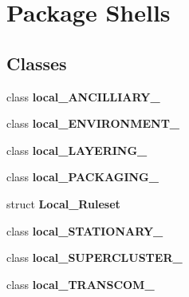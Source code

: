 \hypertarget{namespace_shells}{\section{Package Shells}
\label{namespace_shells}
}
\subsection*{Classes}
\begin{DoxyCompactItemize}
\item 
class {\bfseries local\+\_\+\+A\+N\+C\+I\+L\+L\+I\+A\+R\+Y\+\_\+}
\item 
class {\bfseries local\+\_\+\+E\+N\+V\+I\+R\+O\+N\+M\+E\+N\+T\+\_\+}
\item 
class {\bfseries local\+\_\+\+L\+A\+Y\+E\+R\+I\+N\+G\+\_\+}
\item 
class {\bfseries local\+\_\+\+P\+A\+C\+K\+A\+G\+I\+N\+G\+\_\+}
\item 
struct {\bfseries Local\+\_\+\+Ruleset}
\item 
class {\bfseries local\+\_\+\+S\+T\+A\+T\+I\+O\+N\+A\+R\+Y\+\_\+}
\item 
class {\bfseries local\+\_\+\+S\+U\+P\+E\+R\+C\+L\+U\+S\+T\+E\+R\+\_\+}
\item 
class {\bfseries local\+\_\+\+T\+R\+A\+N\+S\+C\+O\+M\+\_\+}
\end{DoxyCompactItemize}
